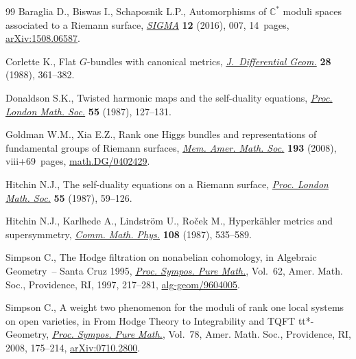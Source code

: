 \documentclass[11pt]{article}
\numberwithin{equation}{section}
\begin{document}
\begin{thebibliography}{99}
Baraglia D., Biswas I., Schaposnik L.P., Automorphisms of {$\mathbb{C}^*$}
 moduli spaces associated to a {R}iemann surface, \href{https://doi.org/10.3842/SIGMA.2016.007}{\textit{SIGMA}} \textbf{12}
 (2016), 007, 14~pages, \href{https://arxiv.org/abs/1508.06587}{arXiv:1508.06587}.

Corlette K., Flat {$G$}-bundles with canonical metrics, \href{https://doi.org/10.4310/jdg/1214442469}{\textit{J.~Differential
 Geom.}} \textbf{28} (1988), 361--382.

Donaldson S.K., Twisted harmonic maps and the self-duality equations,
 \href{https://doi.org/10.1112/plms/s3-55.1.127}{\textit{Proc. London Math. Soc.}} \textbf{55} (1987), 127--131.

Goldman W.M., Xia E.Z., Rank one {H}iggs bundles and representations of
 fundamental groups of {R}iemann surfaces, \href{https://doi.org/10.1090/memo/0904}{\textit{Mem. Amer. Math. Soc.}}
 \textbf{193} (2008), viii+69~pages, \href{https://arxiv.org/abs/math.DG/0402429}{math.DG/0402429}.

Hitchin N.J., The self-duality equations on a {R}iemann surface, \href{https://doi.org/10.1112/plms/s3-55.1.59}{\textit{Proc.
 London Math. Soc.}} \textbf{55} (1987), 59--126.

Hitchin N.J., Karlhede A., Lindstr\"om U., Ro\v{c}ek M., Hyperk\"ahler metrics
 and supersymmetry, \href{https://doi.org/10.1007/BF01214418}{\textit{Comm. Math. Phys.}} \textbf{108} (1987), 535--589.

Simpson C., The {H}odge f\/iltration on nonabelian cohomology, in Algebraic
 Geometry~-- {S}anta {C}ruz 1995, \href{https://doi.org/10.1090/pspum/062.2/1492538}{\textit{Proc. Sympos. Pure Math.}}, Vol.~62,
 Amer. Math. Soc., Providence, RI, 1997, 217--281, \href{https://arxiv.org/abs/alg-geom/9604005}{alg-geom/9604005}.

Simpson C., A weight two phenomenon for the moduli of rank one local systems on
 open varieties, in From {H}odge Theory to Integrability and {TQFT}
 tt*-Geometry, \href{https://doi.org/10.1090/pspum/078/2483751}{\textit{Proc. Sympos. Pure Math.}}, Vol.~78, Amer. Math. Soc.,
 Providence, RI, 2008, 175--214, \href{https://arxiv.org/abs/0710.2800}{arXiv:0710.2800}.

\end{thebibliography}
\end{document}
